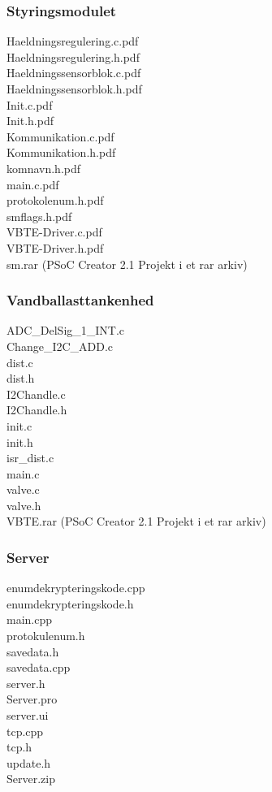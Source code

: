 \subsubsection{Styringsmodulet}
Haeldningsregulering.c.pdf\\
Haeldningsregulering.h.pdf\\
Haeldningssensorblok.c.pdf\\
Haeldningssensorblok.h.pdf\\
Init.c.pdf\\
Init.h.pdf\\
Kommunikation.c.pdf\\
Kommunikation.h.pdf\\
komnavn.h.pdf\\
main.c.pdf\\
protokolenum.h.pdf\\
smflags.h.pdf\\
VBTE-Driver.c.pdf\\
VBTE-Driver.h.pdf\\
sm.rar (PSoC Creator 2.1 Projekt i et rar arkiv)\\
\subsubsection{Vandballasttankenhed}
ADC\_DelSig\_1\_INT.c\\
Change\_I2C\_ADD.c\\
dist.c\\
dist.h\\
I2Chandle.c\\
I2Chandle.h\\
init.c\\
init.h\\
isr\_dist.c\\
main.c\\
valve.c\\
valve.h\\
VBTE.rar (PSoC Creator 2.1 Projekt i et rar arkiv)\\

\subsubsection*{Server}
enumdekrypteringskode.cpp\\
enumdekrypteringskode.h\\
main.cpp\\
protokulenum.h\\
savedata.h\\
savedata.cpp\\
server.h\\
Server.pro\\
server.ui\\
tcp.cpp\\
tcp.h\\
update.h\\
Server.zip\\
